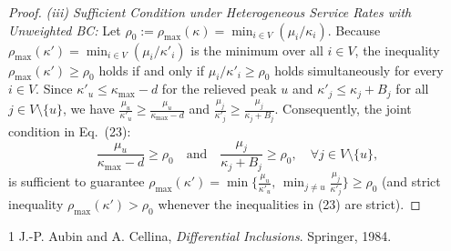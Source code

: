 \documentclass[11pt]{article}
\newenvironment{IEEEproof}{\begin{proof}}{\end{proof}}
\begin{document}
\begin{IEEEproof}
{\noindent\textit{(iii) Sufficient Condition under Heterogeneous Service Rates with Unweighted BC:}
Let $\rho_0 := \rho_{\max}(\kappa) = \min_{i \in V}(\mu_i/\kappa_i)$. Because $\rho_{\max}(\kappa') = \min_{i \in V}(\mu_i/\kappa'_i)$ is the minimum over all $i \in V$, the inequality $\rho_{\max}(\kappa') \ge \rho_0$ holds if and only if $\mu_i / \kappa'_i \ge \rho_0$ holds simultaneously for every $i \in V$. Since $\kappa'_u \le \kappa_{\max} - d$ for the relieved peak $u$ and $\kappa'_j \le \kappa_j + B_j$ for all $j \in V \setminus \{u\}$, we have $\frac{\mu_u}{\kappa'_u} \ge \frac{\mu_u}{\kappa_{\max}-d}$ and $\frac{\mu_j}{\kappa'_j} \ge \frac{\mu_j}{\kappa_j+B_j}$. Consequently, the joint condition in Eq.~(23):
\begin{equation}
\frac{\mu_u}{\kappa_{\max} - d} \ge \rho_0 \quad \text{and} \quad \frac{\mu_j}{\kappa_j + B_j} \ge \rho_0,\quad \forall j \in V \setminus \{u\},
\end{equation}
is sufficient to guarantee $\rho_{\max}(\kappa') = \min\big\{\frac{\mu_u}{\kappa'_u},\, \min_{j\neq u}\frac{\mu_j}{\kappa'_j}\big\} \ge \rho_0$ (and strict inequality $\rho_{\max}(\kappa') > \rho_0$ whenever the inequalities in (23) are strict).}
\end{IEEEproof}





\begin{thebibliography}{1} J.-P. Aubin and A. Cellina, \textit{Differential Inclusions}. Springer, 1984.\end{thebibliography}
\end{document}
